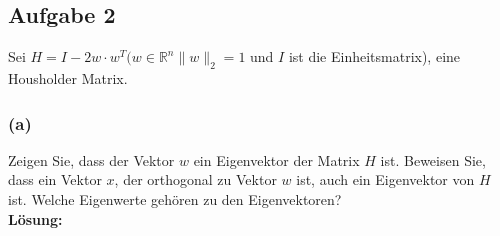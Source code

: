 \documentclass[11pt,a4paper,ngerman]{article}
\begin{document}
\subsection*{Aufgabe 2}

Sei $H = I - 2w \cdot w^T (w \in \mathbb{R}^n \| w \|_2 = 1$ und $I$ ist die Einheitsmatrix), eine Housholder Matrix.

\subsubsection*{(a)}

Zeigen Sie, dass der Vektor $w$ ein Eigenvektor der Matrix $H$ ist. Beweisen Sie, dass ein Vektor $x$, der orthogonal zu Vektor $w$
ist, auch ein Eigenvektor von $H$ ist. Welche Eigenwerte gehören zu den Eigenvektoren?\\

\textbf{Lösung:}\\
\end{document}
